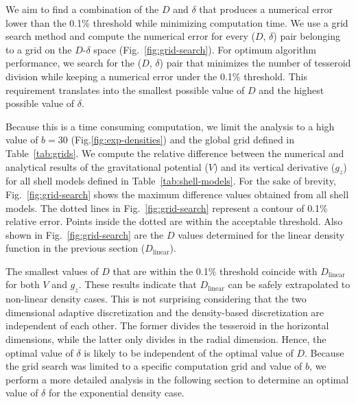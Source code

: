 \documentclass[extra, referee]{gji}
\begin{document}
We aim to find a combination of the $D$ and $\delta$ that produces a numerical error
lower than the 0.1\% threshold while minimizing computation time.
We use a grid search method and compute the numerical error for every ($D$, $\delta$)
pair belonging to a grid on the $D$-$\delta$ space (Fig.~\ref{fig:grid-search}).
For optimum algorithm performance, we search for the ($D$, $\delta$) pair that minimizes
the number of tesseroid division while keeping a numerical error under the 0.1\%
threshold.
This requirement translates into the smallest possible value of $D$ and the highest
possible value of $\delta$.

Because this is a time consuming computation, we limit the analysis to a high value of
$b=30$ (Fig.\ref{fig:exp-densities}) and the global grid defined in
Table~\ref{tab:grids}.
We compute the relative difference between the numerical and analytical results
of the gravitational potential ($V$) and its vertical derivative ($g_z$) for all shell
models defined in Table~\ref{tab:shell-models}.
For the sake of brevity, Fig.~\ref{fig:grid-search} shows the maximum difference values
obtained from all shell models.
The dotted lines in Fig.~\ref{fig:grid-search} represent a contour of 0.1\% relative
error.
Points inside the dotted are within the acceptable threshold.
Also shown in Fig.~\ref{fig:grid-search} are the $D$ values determined for the linear
density function in the previous section ($D_\text{linear}$).

The smallest values of $D$ that are within the 0.1\% threshold coincide with
$D_\text{linear}$ for both $V$ and $g_z$.
These results indicate that $D_\text{linear}$ can be safely extrapolated to non-linear
density cases.
This is not surprising considering that the two dimensional adaptive
discretization and the density-based discretization are independent of each other.
The former divides the tesseroid in the horizontal dimensions, while the latter only
divides in the radial dimension.
Hence, the optimal value of $\delta$ is likely to be independent of the optimal value of
$D$.
Because the grid search was limited to a specific computation grid and value of $b$,
we perform a more detailed analysis in the following section to determine an optimal
value of $\delta$ for the exponential density case.
\end{document}
